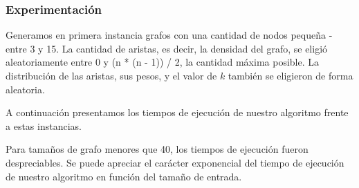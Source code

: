 \subsubsection{Experimentación}

Generamos en primera instancia grafos con una cantidad de nodos pequeña - entre 3 y 15. La cantidad de aristas, es decir, la densidad del grafo,
se eligió aleatoriamente entre 0 y (n * (n - 1)) / 2, la cantidad máxima posible. La distribución de las aristas, sus pesos, y el valor de $k$
también se eligieron de forma aleatoria.

A continuación presentamos los tiempos de ejecución de nuestro algoritmo frente a estas instancias. 



Para tamaños de grafo menores que 40, los tiempos de ejecución fueron despreciables. Se puede apreciar el carácter exponencial del tiempo de
ejecución de nuestro algoritmo en función del tamaño de entrada.

